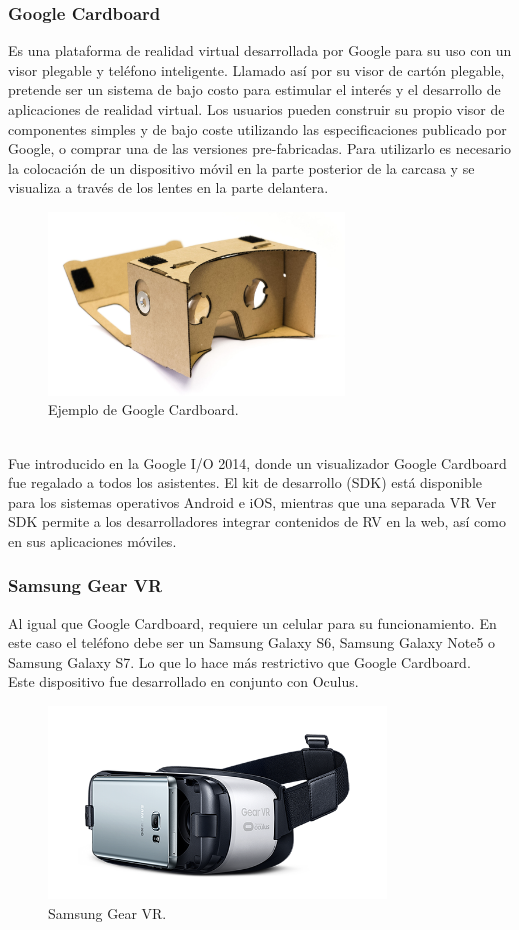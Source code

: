 \documentclass[12pt]{article}
\begin{document}
\subsubsection{Google Cardboard}
Es una plataforma de realidad virtual desarrollada por Google\cite{cardboard} para su uso con un visor plegable y teléfono inteligente. Llamado así por su visor de cartón plegable, pretende ser un sistema de bajo costo para estimular el interés y el desarrollo de aplicaciones de realidad virtual. Los usuarios pueden construir su propio visor de componentes simples y de bajo coste utilizando las especificaciones publicado por Google, o comprar una de las versiones pre-fabricadas. Para utilizarlo es necesario  la colocación de un dispositivo móvil en la parte posterior de la carcasa y se  visualiza a través de los lentes en la parte delantera.
\begin{figure}[h!]
\includegraphics[width=0.7\textwidth,center]{google_cardboard.jpg}
\caption{Ejemplo de Google Cardboard.}
\end{figure}
\\Fue introducido en la Google I/O 2014, donde un visualizador Google Cardboard fue regalado a todos los asistentes. El kit de desarrollo (SDK) está disponible para los sistemas operativos Android e iOS, mientras que una separada VR Ver SDK permite a los desarrolladores integrar contenidos de RV en la web, así como en sus aplicaciones móviles. 
\subsubsection{Samsung Gear VR}
Al igual que Google Cardboard, requiere un celular para su funcionamiento. En este caso el teléfono debe ser un Samsung Galaxy S6, Samsung Galaxy Note5 o Samsung Galaxy S7\cite{samsungvr}. Lo que lo hace más restrictivo que Google Cardboard.
\\Este dispositivo fue desarrollado en conjunto con Oculus\cite{samsungvr}.
\begin{figure}[h!]
\includegraphics[width=0.8\textwidth,center]{samsungvr.png}
\caption{Samsung Gear VR.}
\end{figure}
\clearpage
\end{document}
